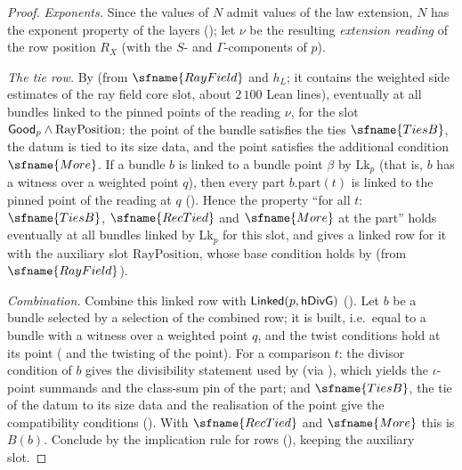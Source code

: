 \begin{proof}
\emph{Exponents.} Since the values of $N$ admit values of the law extension, $N$ has the exponent property of the layers
(); let $\nu$ be the resulting \emph{extension reading} of the row
position $R_X$ (with the $S$- and $\Gamma$-components of $p$).

\emph{The tie row.} By  (from $\sfname{RayField}$ and $h_L$; it contains the
weighted side estimates of the ray field core slot, about $2\,100$ Lean lines), eventually at all bundles linked to the pinned
points of the reading $\nu$, for the slot $\mathsf{Good}_p\wedge\mathrm{RayPosition}$: the point of the bundle satisfies the
ties $\sfname{TiesB}$, the datum is tied to its size data, and the point satisfies the additional condition $\sfname{More}$. If a
bundle $b$ is linked to a bundle point $\beta$ by $\mathrm{Lk}_p$ (that is, $b$ has a witness over a weighted point $q$), then
every part $b.\mathrm{part}(t)$ is linked to the pinned point of the reading at $q$
(). Hence the property ``for all $t$: $\sfname{TiesB}$,
$\sfname{RecTied}$ and $\sfname{More}$ at the part'' holds eventually at all bundles linked by $\mathrm{Lk}_p$ for this slot, and
gives a linked row for it with the auxiliary slot $\mathrm{RayPosition}$, whose base condition holds by
 (from $\sfname{RayField}$).

\emph{Combination.} Combine this linked row with $\mathsf{Linked}(p,\mathsf{hDivG})$ (). Let $b$
be a bundle selected by a selection of the combined row; it is built, i.e.\ equal to a bundle with a witness over a weighted
point $q$, and the twist conditions hold at its point ( and the twisting
of the point). For a comparison $t$: the divisor condition of $b$ gives the divisibility statement used by
 (via ),
which yields the $\iota$-point summands and the class-sum pin of the part; and $\sfname{TiesB}$, the tie of the datum to its size
data and the realisation of the point give the compatibility conditions
(). With $\sfname{RecTied}$ and $\sfname{More}$ this is $B(b)$. Conclude by the
implication rule for rows (), keeping the auxiliary slot.
\end{proof}


